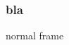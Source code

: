 \documentclass{beamer}
\begin{document}
\begin{frame}[getoffthestage]
\end{frame}

\begin{frame}
    \frametitle{bla}
    normal frame
\end{frame}
\end{document}
